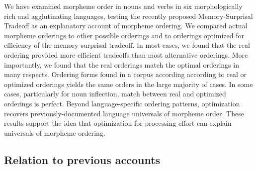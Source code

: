 \documentclass[11pt,letterpaper]{article}
\newcommand{\citep}{\parencite}
\begin{document}
We have examined morpheme order in nouns and verbs in six morphologically rich and agglutinating languages, testing the recently proposed Memory-Surprisal Tradeoff \citep{Hahn2020modeling} as an explanatory account of morpheme ordering.
We compared actual morpheme orderings to other possible orderings and to orderings optimized for efficiency of the memory-surprisal tradeoff.
In most cases, we found that the real ordering provided more efficient tradeoffs than most alternative orderings.
More importantly, we found that the real orderings match the optimal orderings in many respects.
Ordering forms found in a corpus according according to real or optimized orderings yields the same orders in the large majority of cases.
In some cases, particularly for noun inflection, match between real and optimized orderings is perfect.
Beyond language-specific ordering patterns, optimization recovers previously-documented language universals of morpheme order.
These results support the idea that optimization for processing effort can explain universals of morpheme ordering.





\subsection{Relation to previous accounts}


\end{document}
